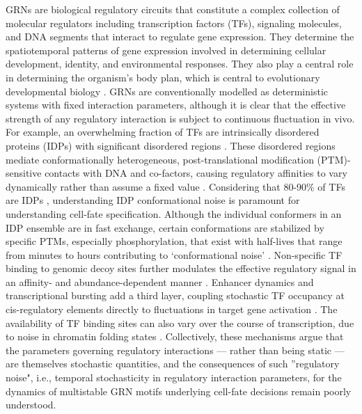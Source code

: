 \documentclass[11pt]{article}
\begin{document}
GRNs are biological regulatory circuits that constitute a complex collection of molecular regulators including transcription factors (TFs), signaling molecules, and DNA segments that interact to regulate gene expression. They determine the spatiotemporal patterns of gene expression involved in determining cellular development, identity, and environmental responses. They also play a central role in determining the organism’s body plan, which is central to evolutionary developmental biology \cite{Davidson2005, Davidson2006, Maizels2026}. GRNs are conventionally modelled as deterministic systems with fixed interaction parameters, although it is clear that the effective strength of any regulatory interaction is subject to continuous fluctuation in vivo. For example, an overwhelming fraction of TFs are intrinsically disordered proteins (IDPs) with significant disordered regions . These disordered regions mediate conformationally heterogeneous, post-translational modification (PTM)-sensitive contacts with DNA and co-factors, causing regulatory affinities to vary dynamically rather than assume a fixed value \cite{Ferrie2022Structure-functionRegulation, Holehouse2023TheRegions}. Considering that 80-90\% of TFs are IDPs \cite{Staby2017}, understanding IDP conformational noise is paramount for understanding cell-fate specification. Although the individual conformers in an IDP ensemble are in fast exchange, certain conformations are stabilized by specific PTMs, especially phosphorylation, that exist with half-lives that range from minutes to hours contributing to ‘conformational noise’ \cite{Kulkarni2022, Kulkarni2019}. Non-specific TF binding to genomic decoy sites further modulates the effective regulatory signal in an affinity- and abundance-dependent manner \cite{Dey2020EnhancementSites, Burger2012InfluenceExpression}. Enhancer dynamics and transcriptional bursting add a third layer, coupling stochastic TF occupancy at cis-regulatory elements directly to fluctuations in target gene activation \cite{Raj2006StochasticCells, Fukaya2016EnhancerBursting}. The availability of TF binding sites can also vary over the course of transcription, due to noise in chromatin folding states \cite{Gamble2025}. Collectively, these mechanisms argue that the parameters governing regulatory interactions — rather than being static — are themselves stochastic quantities, and the consequences of such ''regulatory noise", i.e., temporal stochasticity in regulatory interaction parameters, for the dynamics of multistable GRN motifs underlying cell-fate decisions remain poorly understood.
\end{document}
